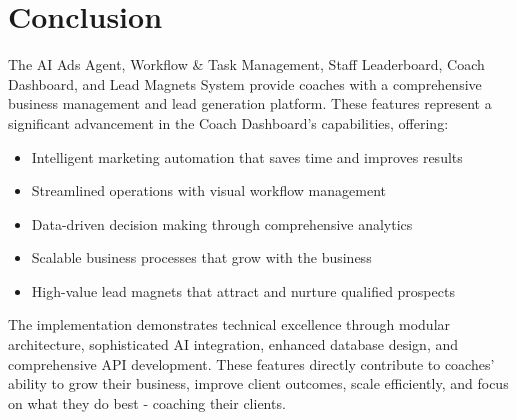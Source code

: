 \documentclass[12pt,a4paper]{article}
\begin{document}
\section{Conclusion}

The AI Ads Agent, Workflow \& Task Management, Staff Leaderboard, Coach Dashboard, and Lead Magnets System provide coaches with a comprehensive business management and lead generation platform. These features represent a significant advancement in the Coach Dashboard's capabilities, offering:

\begin{itemize}
    \item Intelligent marketing automation that saves time and improves results
    \item Streamlined operations with visual workflow management
    \item Data-driven decision making through comprehensive analytics
    \item Scalable business processes that grow with the business
    \item High-value lead magnets that attract and nurture qualified prospects
\end{itemize}

The implementation demonstrates technical excellence through modular architecture, sophisticated AI integration, enhanced database design, and comprehensive API development. These features directly contribute to coaches' ability to grow their business, improve client outcomes, scale efficiently, and focus on what they do best - coaching their clients.
\end{document}
